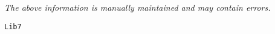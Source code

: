 \label{pkg:lib7}

{\tiny \it The above information is manually maintained and may contain errors.}
\begin{verbatim}
Lib7
\end{verbatim}
